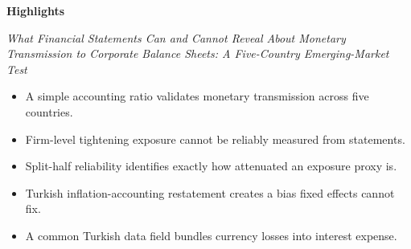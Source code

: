 \documentclass[11pt]{article}
\begin{document}
\thispagestyle{empty}

\begin{center}
{\Large\bfseries Highlights}
\end{center}

\vspace{1em}
\noindent\textit{What Financial Statements Can and Cannot Reveal About Monetary
Transmission to Corporate Balance Sheets: A Five-Country Emerging-Market Test}

\vspace{1.5em}

\begin{itemize}
\setlength{\itemsep}{0.8em}
\item A simple accounting ratio validates monetary transmission across five countries.
\item Firm-level tightening exposure cannot be reliably measured from statements.
\item Split-half reliability identifies exactly how attenuated an exposure proxy is.
\item Turkish inflation-accounting restatement creates a bias fixed effects cannot fix.
\item A common Turkish data field bundles currency losses into interest expense.
\end{itemize}
\end{document}

